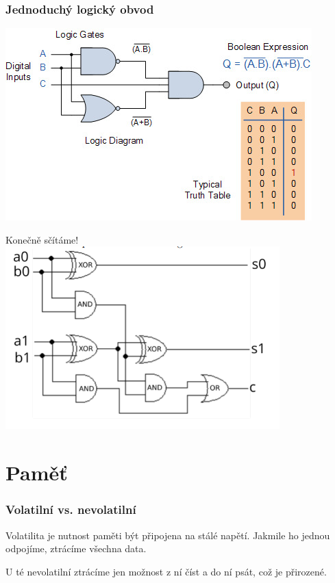 \documentclass{beamer}
\begin{document}
\begin{frame}
	\frametitle{Jednoduchý logický obvod}
	\includegraphics[width=\textwidth]{circut-0000.jpg}
\end{frame}

\begin{frame}{Konečně sčítáme!}
 \includegraphics[scale=0.9]{Screenshot from 2024-09-19 11-10-26.png}
\end{frame}


\section{Paměť}
\label{sec:pamet}

\begin{frame}
	\frametitle{Volatilní vs. nevolatilní}
	\begin{block}{Volatilita}
		je nutnost paměti být připojena na stálé napětí. Jakmile ho jednou odpojíme,
		ztrácíme všechna data.
	\end{block}
	U té nevolatilní ztrácíme jen možnost z ní číst a do ní psát, což je přirozené.
\end{frame}
\end{document}
